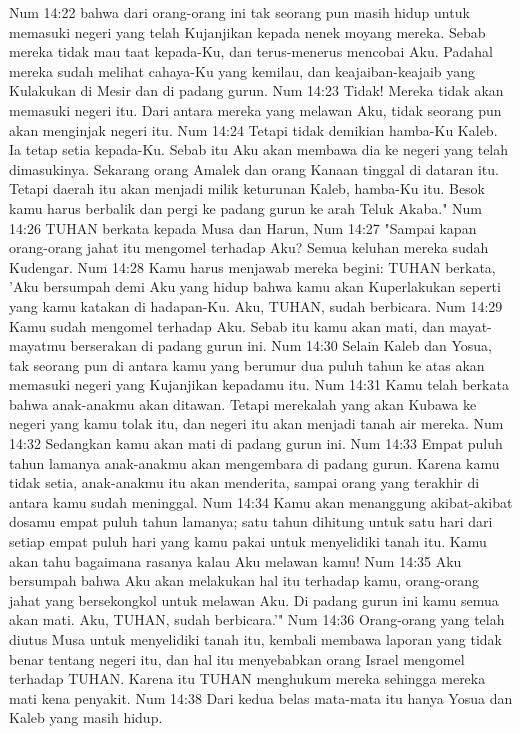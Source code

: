 Num 14:22  bahwa dari orang-orang ini tak seorang pun masih hidup untuk memasuki negeri yang telah Kujanjikan kepada nenek moyang mereka. Sebab mereka tidak mau taat kepada-Ku, dan terus-menerus mencobai Aku. Padahal mereka sudah melihat cahaya-Ku yang kemilau, dan keajaiban-keajaib yang Kulakukan di Mesir dan di padang gurun.
Num 14:23  Tidak! Mereka tidak akan memasuki negeri itu. Dari antara mereka yang melawan Aku, tidak seorang pun akan menginjak negeri itu.
Num 14:24  Tetapi tidak demikian hamba-Ku Kaleb. Ia tetap setia kepada-Ku. Sebab itu Aku akan membawa dia ke negeri yang telah dimasukinya. Sekarang orang Amalek dan orang Kanaan tinggal di dataran itu. Tetapi daerah itu akan menjadi milik keturunan Kaleb, hamba-Ku itu. Besok kamu harus berbalik dan pergi ke padang gurun ke arah Teluk Akaba."
Num 14:26  TUHAN berkata kepada Musa dan Harun,
Num 14:27  "Sampai kapan orang-orang jahat itu mengomel terhadap Aku? Semua keluhan mereka sudah Kudengar.
Num 14:28  Kamu harus menjawab mereka begini: TUHAN berkata, 'Aku bersumpah demi Aku yang hidup bahwa kamu akan Kuperlakukan seperti yang kamu katakan di hadapan-Ku. Aku, TUHAN, sudah berbicara.
Num 14:29  Kamu sudah mengomel terhadap Aku. Sebab itu kamu akan mati, dan mayat-mayatmu berserakan di padang gurun ini.
Num 14:30  Selain Kaleb dan Yosua, tak seorang pun di antara kamu yang berumur dua puluh tahun ke atas akan memasuki negeri yang Kujanjikan kepadamu itu.
Num 14:31  Kamu telah berkata bahwa anak-anakmu akan ditawan. Tetapi merekalah yang akan Kubawa ke negeri yang kamu tolak itu, dan negeri itu akan menjadi tanah air mereka.
Num 14:32  Sedangkan kamu akan mati di padang gurun ini.
Num 14:33  Empat puluh tahun lamanya anak-anakmu akan mengembara di padang gurun. Karena kamu tidak setia, anak-anakmu itu akan menderita, sampai orang yang terakhir di antara kamu sudah meninggal.
Num 14:34  Kamu akan menanggung akibat-akibat dosamu empat puluh tahun lamanya; satu tahun dihitung untuk satu hari dari setiap empat puluh hari yang kamu pakai untuk menyelidiki tanah itu. Kamu akan tahu bagaimana rasanya kalau Aku melawan kamu!
Num 14:35  Aku bersumpah bahwa Aku akan melakukan hal itu terhadap kamu, orang-orang jahat yang bersekongkol untuk melawan Aku. Di padang gurun ini kamu semua akan mati. Aku, TUHAN, sudah berbicara.'"
Num 14:36  Orang-orang yang telah diutus Musa untuk menyelidiki tanah itu, kembali membawa laporan yang tidak benar tentang negeri itu, dan hal itu menyebabkan orang Israel mengomel terhadap TUHAN. Karena itu TUHAN menghukum mereka sehingga mereka mati kena penyakit.
Num 14:38  Dari kedua belas mata-mata itu hanya Yosua dan Kaleb yang masih hidup.
